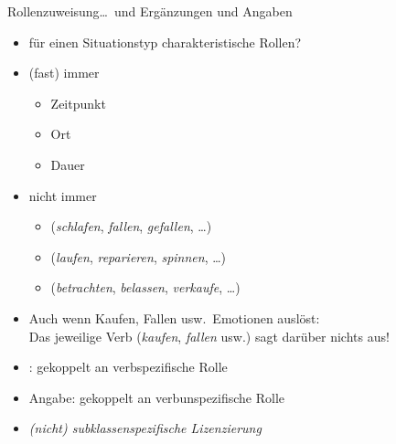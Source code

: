 \begin{frame}
  {Rollenzuweisung\ldots\ und Ergänzungen und Angaben}
  \pause
  \begin{itemize}[<+->]
    \item für einen Situationstyp charakteristische Rollen?
      \Viertelzeile
    \item (fast) \alert{immer} \zB
      \begin{itemize}[<+->]
        \item \alert{Zeitpunkt}
        \item \alert{Ort}
        \item \alert{Dauer}
      \end{itemize}
      \Viertelzeile
    \item \alert{nicht immer} \zB
      \begin{itemize}[<+->]
        \item {} (\textit{schlafen}, \textit{fallen}, \textit{gefallen}, \ldots)
        \item {} (\textit{laufen}, \textit{reparieren}, \textit{spinnen}, \ldots)
        \item {} (\textit{betrachten}, \textit{belassen}, \textit{verkaufe}, \ldots)
      \end{itemize}
      \Viertelzeile
    \item Auch wenn Kaufen, Fallen usw.\ Emotionen auslöst:\\
      \alert{Das jeweilige Verb (\textit{kaufen}, \textit{fallen} usw.) sagt darüber nichts aus!}
      \Viertelzeile
    \item {}: gekoppelt an \alert{verbspezifische} Rolle 
    \item \alert{Angabe}: gekoppelt an \alert{verbunspezifische} Rolle
    \item \textit{(nicht) subklassenspezifische Lizenzierung}
  \end{itemize}
\end{frame}

